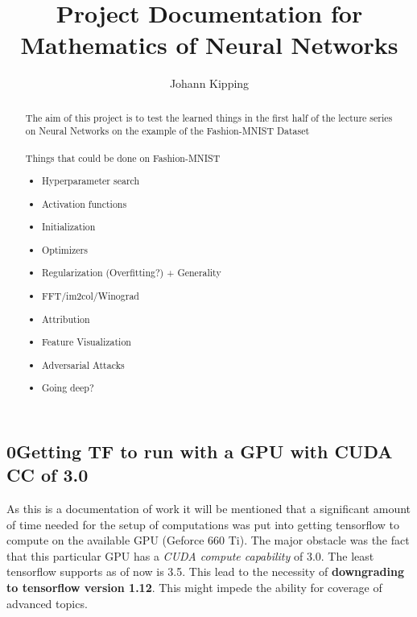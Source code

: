 \documentclass{article}
\title{Project Documentation for \\Mathematics of Neural Networks}
\author{Johann Kipping}
\begin{document}
\maketitle

\begin{multicols}{2}

\begin{abstract}
The aim of this project is to test the learned things in the first half of the lecture series on Neural Networks on the example of the Fashion-MNIST Dataset\\
\\
Things that could be done on Fashion-MNIST
\begin{itemize}
	\item Hyperparameter search
	\item Activation functions
	\item Initialization
	\item Optimizers
	\item Regularization (Overfitting?) + Generality
	\item FFT/im2col/Winograd
	\item Attribution
	\item Feature Visualization
	\item Adversarial Attacks
	\item Going deep?
\end{itemize}
\end{abstract}

\section*{0\quad Getting TF to run with a GPU with CUDA CC of 3.0}
As this is a documentation of work it will be mentioned that a significant amount of time needed for the setup of computations was put into getting tensorflow to compute on the available GPU (Geforce 660 Ti). The major obstacle was the fact that this particular GPU has a \textit{CUDA compute capability} of 3.0. The least tensorflow supports as of now is 3.5. This lead to the necessity of \textbf{downgrading to tensorflow version 1.12}. This might impede the ability for coverage of advanced topics.


\end{multicols}
\end{document}
